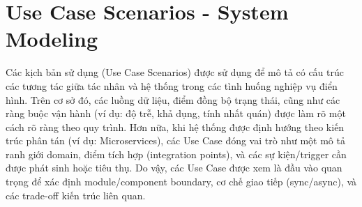 \section{Use Case Scenarios - System Modeling}
Các kịch bản sử dụng (Use Case Scenarios) được sử dụng để mô tả có cấu trúc các tương tác giữa tác nhân và hệ thống trong các tình huống nghiệp vụ điển hình. Trên cơ sở đó, các luồng dữ liệu, điểm đồng bộ trạng thái, cũng như các ràng buộc vận hành (ví dụ: độ trễ, khả dụng, tính nhất quán) được làm rõ một cách rõ ràng theo quy trình. Hơn nữa, khi hệ thống được định hướng theo kiến trúc phân tán (ví dụ: Microservices), các Use Case đóng vai trò như một mô tả ranh giới domain, điểm tích hợp (integration points), và các sự kiện/trigger cần được phát sinh hoặc tiêu thụ. Do vậy, các Use Case được xem là đầu vào quan trọng để xác định module/component boundary, cơ chế giao tiếp (sync/async), và các trade-off kiến trúc liên quan.

